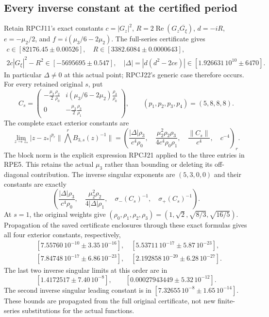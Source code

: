 \documentclass[11pt]{article}
\begin{document}
\subsection{Every inverse constant at the certified period}
Retain RPCJ11's exact constants
$c=|G_z|^2$, $R=2\operatorname{Re}(G_z\overline{G_\xi})$,
$d=-iR$, $e=-\mu_2/2$, and
$f=i(\mu_3/6-2\mu_2)$.
The full-series certificate gives
\[
 \begin{gathered}
 c\in[82176.45\mathbin\pm0.00526],\quad
 R\in[3382.6084\mathbin\pm0.0000643],\\
 2c|G_\xi|^2-R^2\in[-5695695\mathbin\pm0.547],\quad
 |\Delta|=|d(d^2-2ce)|\in[1.926631\,10^{10}\mathbin\pm6470].
 \end{gathered}\tag{RPE4}
\]
In particular $\Delta\ne0$ at this actual point; RPCJ22's generic
case therefore occurs. For every retained original $s$, put
\[
 C_s=\begin{pmatrix}
 -\frac{\mu_2}2\frac{\rho_2}{\rho_0}&
 i(\mu_3/6-2\mu_2)\frac{\rho_3}{\rho_0}\\
 0&-\frac{\mu_2}2\frac{\rho_3}{\rho_1}
 \end{pmatrix},\qquad
 (p_1,p_2,p_3,p_4)=(5,8,8,8).
 \tag{RPE5}
\]
The complete exact exterior constants are
\[
 \lim_{z\to z_*}|z-z_*|^{p_r}\|\bigwedge^rB_{3,s}(z)^{-1}\|
 =\left(
 \frac{|\Delta|\rho_3}{c^4\rho_0},\quad
 \frac{\mu_2^2\rho_2\rho_3}{4c^4\rho_0\rho_1},\quad
 \frac{\|C_s\|}{c^4},\quad c^{-4}
 \right)_r.
 \tag{RPE6}
\]
The block norm is the explicit expression RPCJ21 applied to the
three entries in RPE5. This retains the actual $\mu_3$ rather than
bounding or deleting its off-diagonal contribution.
The inverse singular exponents are $(5,3,0,0)$ and their constants
are exactly
\[
 \left(
 \frac{|\Delta|\rho_3}{c^4\rho_0},\quad
 \frac{\mu_2^2\rho_2}{4|\Delta|\rho_1},\quad
 \sigma_-(C_s)^{-1},\quad\sigma_+(C_s)^{-1}
 \right).
 \tag{RPE7}
\]
At $s=1$, the original weights give
$(\rho_0,\rho_1,\rho_2,\rho_3)=(1,\sqrt2,\sqrt{8/3},\sqrt{16/5})$.
Propagation of the saved certificate enclosures through these exact
formulas gives all four exterior constants, respectively,
\[
 \begin{split}
 &[7.55760\,10^{-10}\mathbin\pm3.35\,10^{-16}],\quad
 [5.53711\,10^{-17}\mathbin\pm5.87\,10^{-23}],\\
 &[7.84748\,10^{-17}\mathbin\pm6.86\,10^{-23}],\quad
 [2.192858\,10^{-20}\mathbin\pm6.28\,10^{-27}].
 \end{split}\tag{RPE8}
\]
The last two inverse singular limits at this order are in
\[
[1.4172517\mathbin\pm7.40\,10^{-8}],\qquad
[0.00027943449\mathbin\pm5.32\,10^{-12}].
\]
The second inverse
singular leading constant is in
$[7.32655\,10^{-8}\mathbin\pm1.65\,10^{-14}]$.
These bounds are propagated from the full original certificate,
not new finite-series substitutions for the actual functions.
\end{document}
